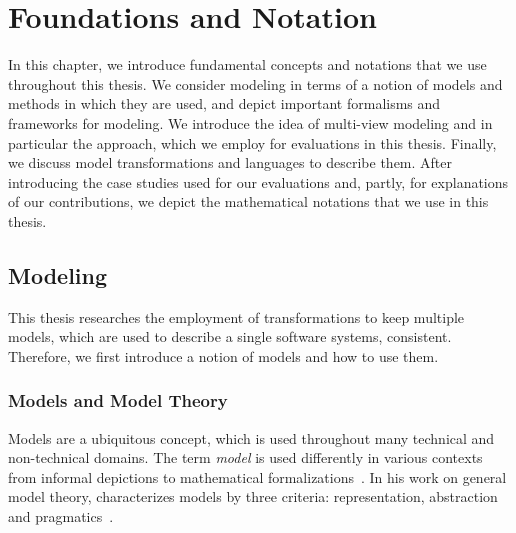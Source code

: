 \chapter{Foundations and Notation
}
\label{chap:foundations}

In this chapter, we introduce fundamental concepts and notations that we use throughout this thesis.
We consider modeling in terms of a notion of models and methods in which they are used, and depict important formalisms and frameworks for modeling. %
We introduce the idea of multi-view modeling and in particular the \vitruv approach, which we employ for evaluations in this thesis.
Finally, we discuss model transformations and languages to describe them. %
After introducing the case studies used for our evaluations and, partly, for explanations of our contributions, we depict the mathematical notations that we use in this thesis.


\section{Modeling}
\label{chap:foundations:modeling}

This thesis researches the employment of transformations to keep multiple models, which are used to describe a single software systems, consistent.
Therefore, we first introduce a notion of models and how to use them.


\subsection{Models and Model Theory}
\label{chap:foundations:modeling:models}

Models are a ubiquitous concept, which is used throughout many technical and non-technical domains.
The term \emph{model} is used differently in various contexts from informal depictions to mathematical formalizations~\cite{stachowiak1973modelltheorie-Book}.
In his work on general model theory, \citeauthor{stachowiak1973modelltheorie-Book} characterizes models by three criteria: representation, abstraction and pragmatics~\cite[p.~131--133]{stachowiak1973modelltheorie-Book}.

